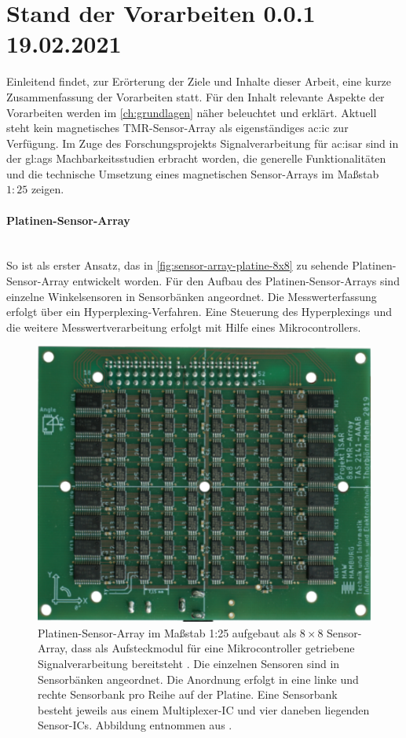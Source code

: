 %

\section{Stand der Vorarbeiten 0.0.1 19.02.2021}\label{sec:stand-der-vorarbeiten}

Einleitend findet, zur Erörterung der Ziele und Inhalte dieser Arbeit, eine kurze Zusammenfassung der Vorarbeiten statt.
Für den Inhalt relevante Aspekte der Vorarbeiten werden im \autoref{ch:grundlagen} näher beleuchtet und erklärt.
\newline
Aktuell steht kein magnetisches TMR-Sensor-Array als eigenständiges \gls{ac:ic} zur Verfügung. Im Zuge des Forschungsprojekts Signalverarbeitung für \gls{ac:isar} sind in der \gls{gl:ags} Machbarkeitsstudien \cite{Mehm2019}\cite{Ernsting2020} erbracht worden, die generelle Funktionalitäten und die technische Umsetzung eines magnetischen Sensor-Arrays im Maßstab $1:25$ zeigen.


\paragraph{Platinen-Sensor-Array}\label{par:platinen-sensor-array}$~$\\


So ist als erster Ansatz, das in \autoref{fig:sensor-array-platine-8x8} zu sehende Platinen-Sensor-Array entwickelt worden. Für den Aufbau des Platinen-Sensor-Arrays sind einzelne Winkelsensoren in Sensorbänken angeordnet. Die Messwerterfassung erfolgt über ein Hyperplexing-Verfahren.
Eine Steuerung des Hyperplexings und die weitere Messwertverarbeitung erfolgt mit Hilfe eines Mikrocontrollers.


\begin{figure}[tbph]
	\centering
	\includegraphics[width=0.5\linewidth]{chapters/images/Sensor-Array-Platine-8x8}
	\caption[Platinen-Sensor-Array im Maßstab 1:25]{Platinen-Sensor-Array im Maßstab 1:25 aufgebaut als $8\times8$ 
	Sensor-Array, dass als Aufsteckmodul für eine Mikrocontroller getriebene Signalverarbeitung bereitsteht 
	\cite{Mehm2019}. Die einzelnen Sensoren sind in Sensorbänken angeordnet. Die Anordnung erfolgt in eine linke und 
	rechte Sensorbank pro Reihe auf der Platine. Eine Sensorbank besteht jeweils aus einem Multiplexer-IC und vier 
	daneben liegenden Sensor-ICs. Abbildung entnommen aus \cite{Mehm2019}.}
	\label{fig:sensor-array-platine-8x8}
\end{figure}


